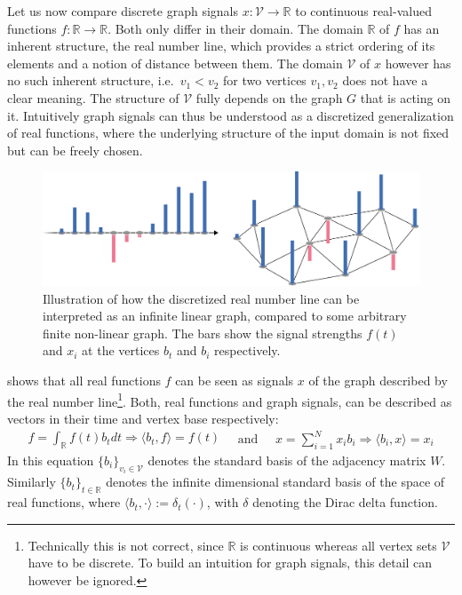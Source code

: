 Let us now compare discrete graph signals $x: \mathcal{V} \to \mathbb{R}$ to continuous real-valued functions $f: \mathbb{R} \to \mathbb{R}$.
Both only differ in their domain.
The domain $\mathbb{R}$ of $f$ has an inherent structure, the real number line, which provides a strict ordering of its elements and a notion of distance between them.
The domain $\mathcal{V}$ of $x$ however has no such inherent structure, i.e.\  $v_1 < v_2$ for two vertices $v_1, v_2$ does not have a clear meaning.
The structure of $\mathcal{V}$ fully depends on the graph $G$ that is acting on it.
Intuitively graph signals can thus be understood as a discretized generalization of real functions, where the underlying structure of the input domain is not fixed but can be freely chosen.
\begin{figure}[ht]
	\centering
	\includegraphics[width=0.8\linewidth]{gfx/sgt/real-graph.pdf}
	\caption{%
		Illustration of how the discretized real number line can be interpreted as an infinite linear graph, compared to some arbitrary finite non-linear graph.
		The bars show the signal strengths $f(t)$ and $x_i$ at the vertices $b_t$ and $b_i$ respectively.
	}\label{fig:sgt:realGraph}
\end{figure}

 shows that all real functions $f$ can be seen as signals $x$ of the graph described by the real number line\footnote{%
	Technically this is not correct, since $\mathbb{R}$ is continuous whereas all vertex sets $\mathcal{V}$ have to be discrete.
	To build an intuition for graph signals, this detail can however be ignored.
}.
Both, real functions and graph signals, can be described as vectors in their time and vertex base respectively:
\begin{equation}
	\begin{split}
		f = \int_{\mathbb{R}} f(t) b_t dt
		\Rightarrow \langle b_t, f \rangle = f(t)
	\end{split}
	\quad\text{and}\quad
	\begin{split}
		x = \sum_{i = 1}^{N} x_i b_i
		\Rightarrow \langle b_i, x \rangle = x_i
	\end{split}
\end{equation}
In this equation ${\{ b_i \}}_{v_i \in \mathcal{V}}$ denotes the standard basis of the adjacency matrix $W$.
Similarly ${\{ b_t \}}_{t \in \mathbb{R}}$ denotes the infinite dimensional standard basis of the space of real functions, where $\langle b_t, \cdot \rangle := \delta_t(\cdot)$, with $\delta$ denoting the Dirac delta function.

